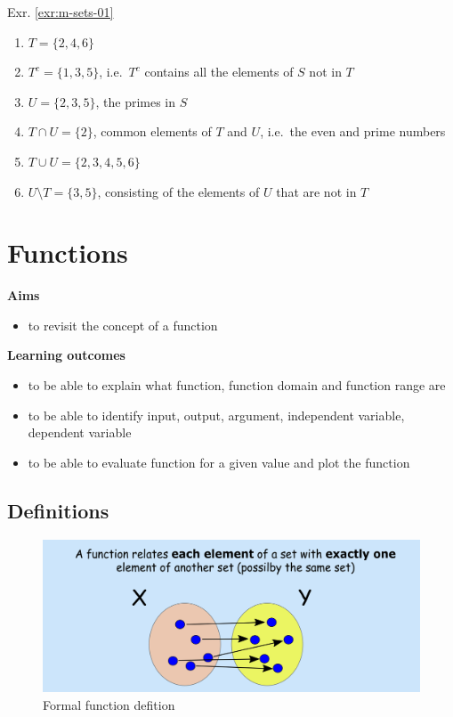 \documentclass[
]{book}
\providecommand{\tightlist}{%
  \setlength{\itemsep}{0pt}\setlength{\parskip}{0pt}}
\theoremstyle{definition}
\theoremstyle{definition}
\theoremstyle{definition}
\theoremstyle{remark}
\begin{document}
Exr. \ref{exr:m-sets-01}

\begin{enumerate}
\def\labelenumi{\alph{enumi})}
\tightlist
\item
  \(T = \{2, 4, 6\}\)
\item
  \(T^c = \{1, 3, 5\}\), i.e.~\(T^c\) contains all the elements of \(S\) not in \(T\)
\item
  \(U = \{2, 3, 5\}\), the primes in \(S\)
\item
  \(T \cap U = \{2\}\), common elements of \(T\) and \(U\), i.e.~the even and prime numbers
\item
  \(T \cup U = \{2, 3, 4, 5, 6\}\)
\item
  \(U \setminus T = \{3, 5\}\), consisting of the elements of \(U\) that are not in \(T\)
\end{enumerate}

\hypertarget{functions}{%
\chapter{Functions}\label{functions}}

\textbf{Aims}

\begin{itemize}
\tightlist
\item
  to revisit the concept of a function
\end{itemize}

\textbf{Learning outcomes}

\begin{itemize}
\tightlist
\item
  to be able to explain what function, function domain and function range are
\item
  to be able to identify input, output, argument, independent variable, dependent variable
\item
  to be able to evaluate function for a given value and plot the function
\end{itemize}

\hypertarget{definitions}{%
\section{Definitions}\label{definitions}}

\begin{figure}

{\centering \includegraphics{figures/precourse/math-functions-definition} 

}

\caption{Formal function defition}\label{fig:func-def}
\end{figure}
\end{document}
